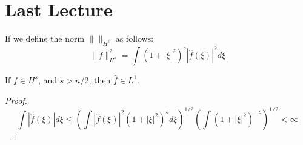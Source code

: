 \newpage
\section{Last Lecture}
If we define the norm $\|\|_{H^s}$ as follows:
\begin{equation*}
    \|f\|_{H^s}^2=\int(1+|\xi|^2)^s|\hat{f}(\xi)|^2d\xi
\end{equation*}
\begin{proposition}
    If $f\in H^s$, and $s>n/2$, then $\hat{f}\in L^1$.
\end{proposition}
\begin{proof}
    \begin{equation*}
        \int |\hat{f}(\xi)|d\xi\leq \left(\int |\hat{f}(\xi)|^2(1+|\xi|^2)^sd\xi\right)^{1/2}\left(\int (1+|\xi|^2)^{-s}\right)^{1/2}<\infty
    \end{equation*}
\end{proof}

